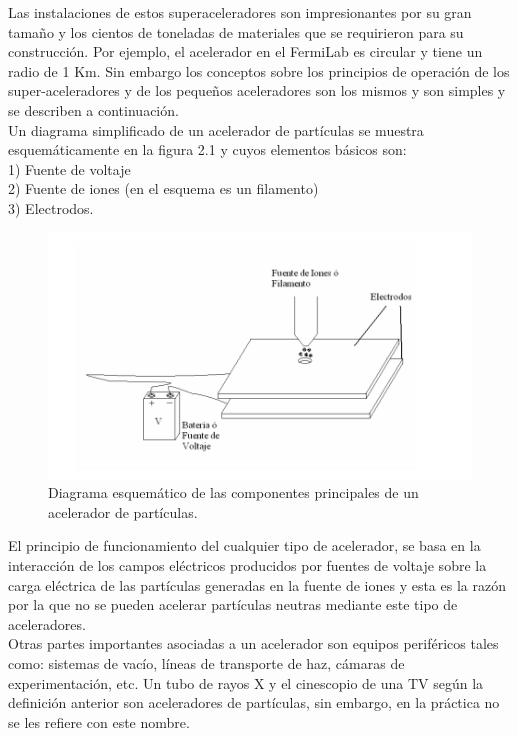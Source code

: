 Las instalaciones de estos superaceleradores son impresionantes por su gran tamaño y los cientos de toneladas de materiales que se requirieron para su construcción. Por ejemplo, el acelerador en el FermiLab es circular y tiene un radio de 1 Km. Sin embargo los conceptos sobre los principios de operación de los super-aceleradores y de los pequeños aceleradores son los mismos y son simples y se describen a continuación.\\

Un diagrama simplificado de un acelerador de partículas se muestra
esquemáticamente en la figura 2.1 y cuyos elementos básicos son:\\
\setlength{\parindent}{0cm}
1) Fuente de voltaje\\
2) Fuente de iones (en el esquema es un filamento)\\
3) Electrodos.

\begin{figure}[H]
\centering
\includegraphics[width=12cm]{capitulo2/figs/acelerador.png}
\caption{Diagrama esquemático de las componentes principales de un acelerador de
partículas.}
\end{figure}

El principio de funcionamiento del cualquier tipo de acelerador, se basa en la
interacción de los campos eléctricos producidos por fuentes de voltaje sobre la
carga eléctrica de las partículas generadas en la fuente de iones y esta es la razón por la que no se pueden acelerar partículas neutras mediante este tipo de aceleradores.\\

Otras partes importantes asociadas a un acelerador son equipos periféricos
tales como: sistemas de vacío, líneas de transporte de haz, cámaras de
experimentación, etc. Un tubo de rayos X y el cinescopio de una TV  según la definición
anterior son aceleradores de partículas, sin embargo, en la práctica no se les refiere con este nombre.\\

